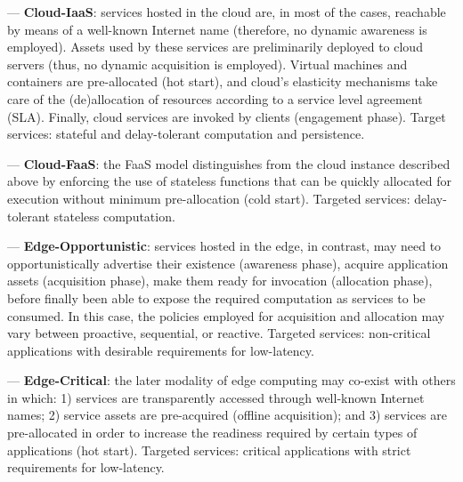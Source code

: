 --- \textbf{Cloud-IaaS}: services hosted in the cloud are, in most of the cases, reachable by means of a well-known Internet name (therefore, no dynamic awareness is employed). Assets used by these services are preliminarily deployed to cloud servers (thus, no dynamic acquisition is employed). Virtual machines and containers are pre-allocated (hot start), and cloud's elasticity mechanisms take care of the (de)allocation of resources according to a service level agreement (SLA). Finally, cloud services are invoked by clients (engagement phase). Target services: stateful and delay-tolerant computation and persistence.

--- \textbf{Cloud-FaaS}: the FaaS model distinguishes from the cloud instance described above by enforcing the use of stateless functions that can be quickly allocated for execution without minimum pre-allocation (cold start). Targeted services: delay-tolerant stateless computation.

--- \textbf{Edge-Opportunistic}: services hosted in the edge, in contrast, may need to opportunistically advertise their existence (awareness phase), acquire application assets (acquisition phase), make them ready for invocation (allocation phase), before finally been able to expose the required computation as services to be consumed. In this case, the policies employed for acquisition and allocation may vary between proactive, sequential, or reactive. Targeted services: non-critical applications with desirable requirements for low-latency.

--- \textbf{Edge-Critical}: the later modality of edge computing may co-exist with others in which: 1) services are transparently accessed through well-known Internet names; 2) service assets are pre-acquired (offline acquisition); and 3) services are pre-allocated in order to increase the readiness required by certain types of applications (hot start). Targeted services: critical applications with strict requirements for low-latency.


